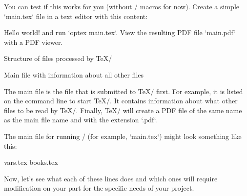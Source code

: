 {You can test if this works for you (without \OpBible/ macros for now). Create a simple `main.tex` file in a text editor with this content:

\begtt
\fontfam[lm]
Hello world!
\bye
\endtt
and run `optex main.tex`. View the resulting PDF file `main.pdf` with a PDF viewer.


\sec Structure of files processed by \TeX/

\secc[main] Main file with information about all other files

The main file is the file that is submitted to \TeX/ first. For example, it is
listed on the command line to start \TeX/. It contains information about what
other files to be read by \TeX/. Finally, \TeX/ will create a PDF file of the same
name as the main file name and with the extension `.pdf`.

The main file for running \OpBible/ (for example, `main.tex`) might look something like this:

\begtt
\load[opbible] %
\enlang %

\def\tmark {BBE}      %

 {vars.tex}  %
 {books.tex} %

\def\txsfile {sources/\tmark-\amark.txs} %
\def\fmtfile {formats/fmt-\tmark-\amark.tex} %
\def\notesfile {notes/notes-\amark.tex} %
\def\introfile {others/intro-\amark.tex} %
\def\articlefile {others/articles-\amark.tex} %

\def\printedbooks {%
 Gen Exod Lev Num Deut Josh Judg Ruth 1Sam 2Sam 1Kgs 2Kgs 1Chr 2Chr Ezra Neh Esth Job Ps 
 Prov Eccl Song Isa Jer Lam Ezek Dan Hos Joel Amos Obad Jonah Mic Nah Hab Zeph Hag Zech Mal    
 Matt Mark Luke John Acts Rom 1Cor 2Cor Gal Eph Phil Col 1Thess 2Thess 1Tim 2Tim Titus  
 Phlm Heb Jas 1Pet 2Pet 1John 2John 3John Jude Rev
}

\processbooks %
\bye
\endtt

Now, let's see what each of these lines does and which ones will require modification on your part for the specific needs of your project.

}
